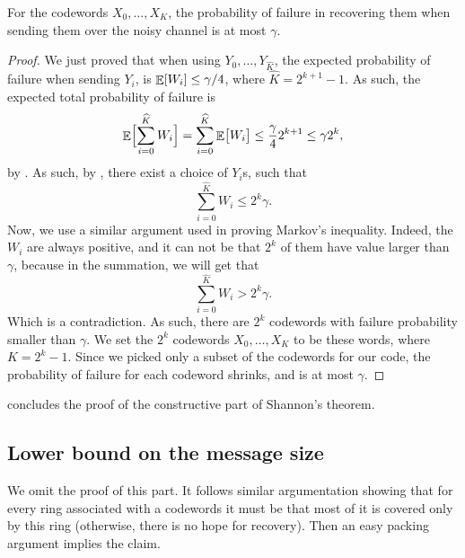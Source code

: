 \begin{lemma}
    For the codewords $X_0, \ldots, X_K$, the probability of failure
    in recovering them when sending them over the noisy channel is at
    most $\gamma$.

\end{lemma}
\begin{proof}
    We just proved that when using $Y_0,\ldots, Y_{\widehat{K}}$, the
    expected probability of failure when sending $Y_i$, is
    $\mathop{\mathbb{E}}\!\left[ {W_i} \right] \leq \gamma/4$, where $\widehat{K} = 2^{k+1}-1$. As
    such, the expected total probability of failure is
    \begin{equation*}
        \Ex{\Bigl. \smash{\sum_{i=0}^{\widehat{K}} W_i} }%
        =%
        \sum_{i=0}^{\widehat{K}} \Ex{\bigl. W_i }%
        \leq%
        \frac{\gamma}{4} 2^{k+1}%
        \leq%
        \gamma 2^{k},
    \end{equation*}
    by . As such, by
    , there exist a choice of $Y_i$s,
    such that
    \begin{equation*}
        \sum_{i=0}^{\widehat{K}} W_i \leq  2^{k} \gamma.
    \end{equation*}
    Now, we use a similar argument used in proving Markov's
    inequality. Indeed, the $W_i$ are always positive, and it can not
    be that $2^k$ of them have value larger than $\gamma$, because in
    the summation, we will get that
    \begin{equation*}
        \sum_{i=0}^{\widehat{K}} W_i > 2^k \gamma.
    \end{equation*}
    Which is a contradiction. As such, there are $2^k$ codewords with
    failure probability smaller than $\gamma$. We set the $2^k$
    codewords $X_0, \ldots, X_{K}$ to be these words, where
    $K = 2^k - 1$. Since we picked only a subset of the codewords for
    our code, the probability of failure for each codeword shrinks,
    and is at most $\gamma$.
\end{proof}

 concludes the proof of the constructive part
of Shannon's theorem.


\subsection{Lower bound on the message size}

We omit the proof of this part. It follows similar argumentation
showing that for every ring associated with a codewords it must be
that most of it is covered only by this ring (otherwise, there is no
hope for recovery). Then an easy packing argument implies the claim.


